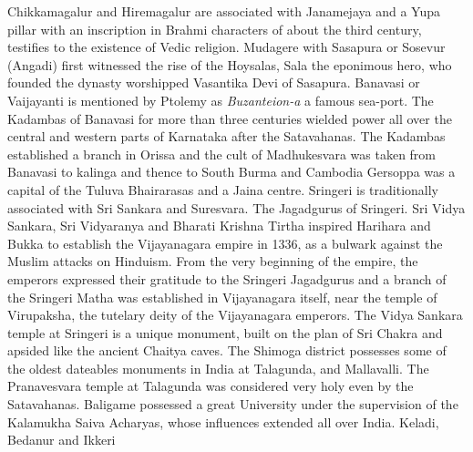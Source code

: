 \documentclass{book}
\begin{document}
Chikkamagalur and Hiremagalur are associated with Janamejaya and a
Yupa pillar with an inscription in Brahmi characters of about the
third century, testifies to the existence of Vedic religion. Mudagere
with Sasapura or Sosevur (Angadi) first witnessed the rise of the
Hoysalas, Sala the eponimous hero, who founded the dynasty worshipped
Vasantika Devi of Sasapura. Banavasi or Vaijayanti is mentioned by
Ptolemy as \textit{Buzanteion-a} a famous sea-port. The Kadambas of
Banavasi for more than three centuries wielded power all over the
central and western parts of Karnataka after the Satavahanas. The
Kadambas established a branch in Orissa and the cult of Madhukesvara
was taken from Banavasi to kalinga and thence to South Burma and
Cambodia Gersoppa was a capital of the Tuluva Bhairarasas and a Jaina
centre. Sringeri is traditionally associated with Sri Sankara and
Suresvara. The Jagadgurus of Sringeri. Sri Vidya Sankara, Sri
Vidyaranya and Bharati Krishna Tirtha inspired Harihara and Bukka to
establish the Vijayanagara empire in 1336, as a bulwark against the
Muslim attacks on Hinduism. From the very beginning of the empire, the
emperors expressed their gratitude to the Sringeri Jagadgurus and a
branch of the Sringeri Matha was established in Vijayanagara itself,
near the temple of Virupaksha, the tutelary deity of the Vijayanagara
emperors. The Vidya Sankara temple at Sringeri is a unique monument,
built on the plan of Sri Chakra and apsided like the ancient Chaitya
caves. The Shimoga district possesses some of the oldest dateables
monuments in India at Talagunda, and Mallavalli. The Pranavesvara
temple at Talagunda was considered very holy even by the
Satavahanas. Baligame possessed a great University under the
supervision of the Kalamukha Saiva Acharyas, whose influences extended
all over India. Keladi, Bedanur and Ikkeri
\end{document}
